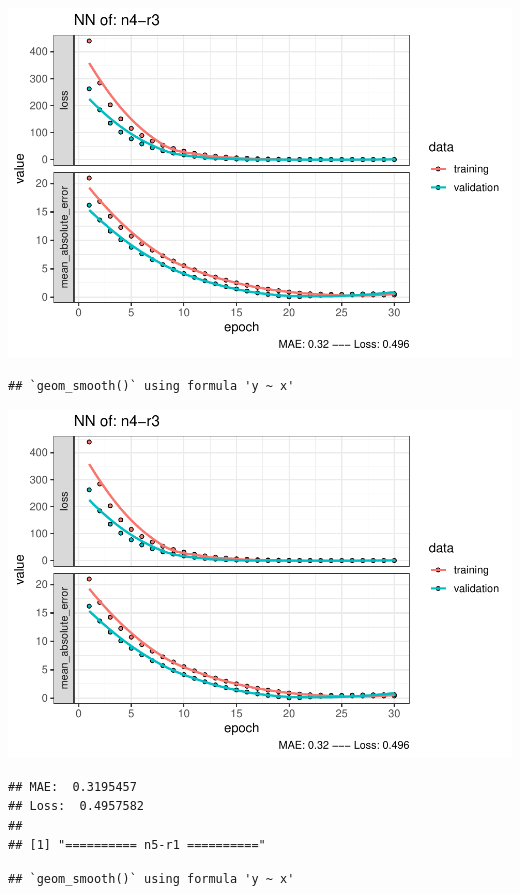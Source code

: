 \documentclass[
]{article}
\begin{document}
\includegraphics{project-code_files/figure-latex/unnamed-chunk-18-33.pdf}

\begin{verbatim}
## `geom_smooth()` using formula 'y ~ x'
\end{verbatim}

\includegraphics{project-code_files/figure-latex/unnamed-chunk-18-34.pdf}

\begin{verbatim}
## MAE:  0.3195457
## Loss:  0.4957582 
## 
## [1] "========== n5-r1 =========="
\end{verbatim}

\begin{verbatim}
## `geom_smooth()` using formula 'y ~ x'
\end{verbatim}
\end{document}
